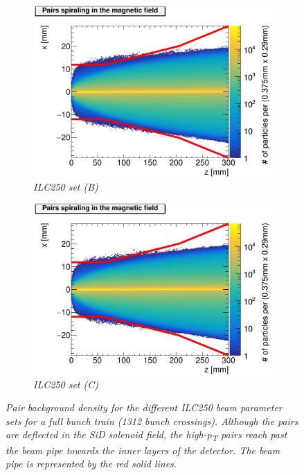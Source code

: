 \begin{figure}[h]
\begin{subfigure}[t]{0.49\textwidth}
\includegraphics[width=\textwidth]{figures/Helix_tracks_xz_50bunches_250GeV_5T_Reduced_Emittance_x_Reduced_Beta_x-1.jpg}
\caption{\textit{ILC250 set (B)}}
\end{subfigure}
\hspace*{0.08cm}
\begin{subfigure}[t]{0.49\textwidth}
\centering
\includegraphics[width=\textwidth]{figures/Helix_tracks_xz_50bunches_250GeV_5T_Reduced_Emittance_x_Reduced_Beta_x_Increased_Beta_y-1.jpg}
\caption{\textit{ILC250 set (C)}}
\end{subfigure}
\caption{\textit{Pair background density for the different ILC250 beam parameter sets for a full bunch train (1312 bunch crossings). Although the pairs are deflected in the SiD solenoid field, the high-p\textsubscript{T} pairs reach past the beam pipe towards the inner layers of the detector. The beam pipe is represented by the red solid lines.}}
\label{fig:Envelopes}
\end{figure}



